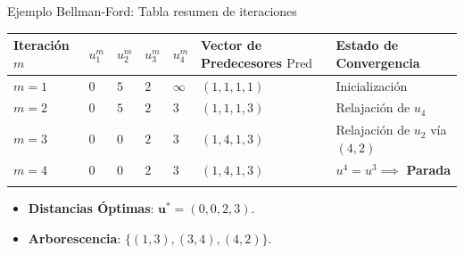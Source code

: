\documentclass[
  ignorenonframetext,
]{beamer}
\providecommand{\tightlist}{%
  \setlength{\itemsep}{0pt}\setlength{\parskip}{0pt}}
\begin{document}
\begin{frame}{Ejemplo Bellman-Ford: Tabla resumen de iteraciones}
\label{ejemplo-bellman-ford-tabla-resumen-de-iteraciones}
\begin{longtable}[]{@{}
  >{\raggedright\arraybackslash}p{}
  >{\raggedright\arraybackslash}p{}
  >{\raggedright\arraybackslash}p{}
  >{\raggedright\arraybackslash}p{}
  >{\raggedright\arraybackslash}p{}
  >{\raggedright\arraybackslash}p{}
  >{\raggedright\arraybackslash}p{}@{}}
\toprule\noalign{}
\begin{minipage}[b]{\linewidth}\raggedright
Iteración \(m\)
\end{minipage} & \begin{minipage}[b]{\linewidth}\raggedright
\(u_1^m\)
\end{minipage} & \begin{minipage}[b]{\linewidth}\raggedright
\(u_2^m\)
\end{minipage} & \begin{minipage}[b]{\linewidth}\raggedright
\(u_3^m\)
\end{minipage} & \begin{minipage}[b]{\linewidth}\raggedright
\(u_4^m\)
\end{minipage} & \begin{minipage}[b]{\linewidth}\raggedright
Vector de Predecesores \(\text{Pred}\)
\end{minipage} & \begin{minipage}[b]{\linewidth}\raggedright
Estado de Convergencia
\end{minipage} \\
\midrule\noalign{}
\endhead
\textbf{\(m=1\)} & \(0\) & \(5\) & \(2\) & \(\infty\) & \((1, 1, 1, 1)\)
& Inicialización \\
\textbf{\(m=2\)} & \(0\) & \(5\) & \(2\) & \(3\) & \((1, 1, 1, 3)\) &
Relajación de \(u_4\) \\
\textbf{\(m=3\)} & \(0\) & \textbf{\(0\)} & \(2\) & \(3\) &
\((1, 4, 1, 3)\) & Relajación de \(u_2\) vía \((4,2)\) \\
\textbf{\(m=4\)} & \(0\) & \(0\) & \(2\) & \(3\) & \((1, 4, 1, 3)\) &
\(u^4 = u^3 \implies\) \textbf{Parada} \\
\bottomrule\noalign{}
\end{longtable}

\begin{itemize}
\tightlist
\item
  \textbf{Distancias Óptimas}: \(\mathbf{u}^* = (0, 0, 2, 3)\).
\item
  \textbf{Arborescencia}: \(\{ (1,3), (3,4), (4,2) \}\).
\end{itemize}
\end{frame}
\end{document}
